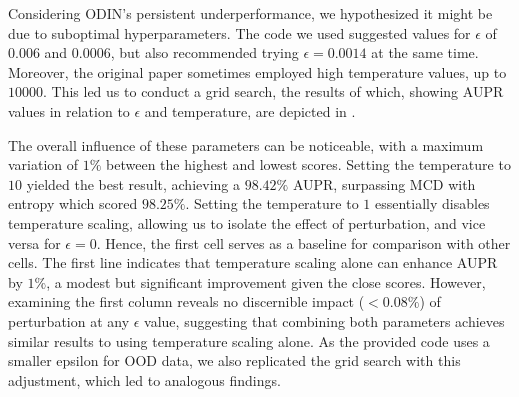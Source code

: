 Considering ODIN's persistent underperformance, we hypothesized it might be due to suboptimal hyperparameters. The code we used suggested values for $ \epsilon $ of $0.006$ and $0.0006$, but also recommended trying $ \epsilon = 0.0014 $ at the same time. Moreover, the original paper sometimes employed high temperature values, up to $10000$. This led us to conduct a grid search, the results of which, showing AUPR values in relation to $ \epsilon $ and temperature, are depicted in .

The overall influence of these parameters can be noticeable, with a maximum variation of $1\%$ between the highest and lowest scores. Setting the temperature to $ 10 $ yielded the best result, achieving a $98.42\%$ AUPR, surpassing MCD with entropy which scored $98.25\%$. Setting the temperature to $ 1 $ essentially disables temperature scaling, allowing us to isolate the effect of perturbation, and vice versa for $ \epsilon = 0 $. Hence, the first cell serves as a baseline for comparison with other cells. The first line indicates that temperature scaling alone can enhance AUPR by $1\%$, a modest but significant improvement given the close scores. However, examining the first column reveals no discernible impact ($<0.08\%$) of perturbation at any $ \epsilon $ value, suggesting that combining both parameters achieves similar results to using temperature scaling alone. As the provided code uses a smaller epsilon for OOD data, we also replicated the grid search with this adjustment, which led to analogous findings.